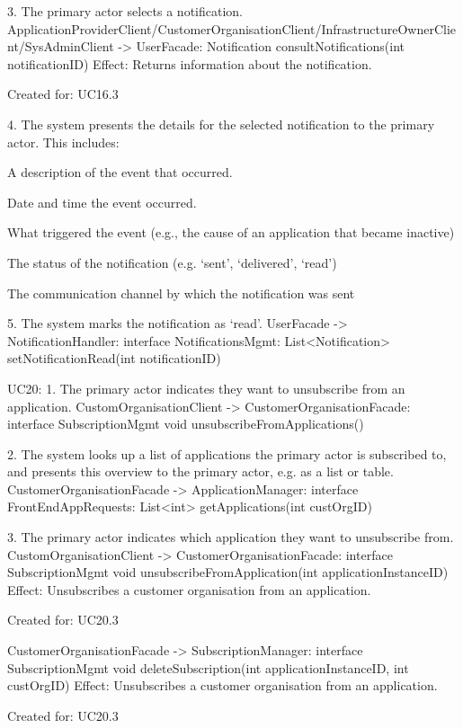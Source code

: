 {{{     3. The primary actor selects a notification.
            ApplicationProviderClient/CustomerOrganisationClient/InfrastructureOwnerClient/SysAdminClient -> UserFacade:
                                Notification consultNotifications(int notificationID)
            Effect: Returns information about the notification.
            \item Created for: UC16.3



     4. The system presents the details for the selected notification to the primary actor. This includes:
        { A description of the event that occurred.
        { Date and time the event occurred.
        { What triggered the event (e.g., the cause of an application that became inactive)
        { The status of the notification (e.g. `sent', `delivered', `read')
        { The communication channel by which the notification was sent


     5. The system marks the notification as `read'.
     UserFacade -> NotificationHandler: interface NotificationsMgmt:
                List<Notification> setNotificationRead(int notificationID)

     UC20:
        1. The primary actor indicates they want to unsubscribe from an application.
            CustomOrganisationClient -> CustomerOrganisationFacade: interface SubscriptionMgmt
                                              void  unsubscribeFromApplications()


        2. The system looks up a list of applications the primary actor is subscribed to, and presents this
            overview to the primary actor, e.g. as a list or table.
            CustomerOrganisationFacade -> ApplicationManager: interface FrontEndAppRequests:
                                             List<int> getApplications(int custOrgID)

        3. The primary actor indicates which application they want to unsubscribe from.
             CustomOrganisationClient -> CustomerOrganisationFacade: interface SubscriptionMgmt
                                              void  unsubscribeFromApplication(int applicationInstanceID)
             Effect: Unsubscribes a customer organisation from an application.
             \item Created for: UC20.3

             CustomerOrganisationFacade -> SubscriptionManager: interface SubscriptionMgmt
                                              void  deleteSubscription(int applicationInstanceID, int custOrgID)
             Effect: Unsubscribes a customer organisation from an application.
             \item Created for: UC20.3

}}}}}}}}
